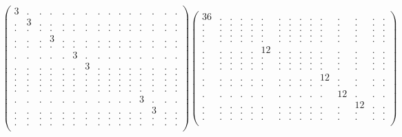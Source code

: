\documentclass[12pt,a4paper]{amsart}
\begin{document}
\begin{align*}
\left(\begin{array}{rrrrrrrrrrrrrrr}%
3&.&.&.&.&.&.&.&.&.&.&.&.&.&.\\%
.&3&.&.&.&.&.&.&.&.&.&.&.&.&.\\%
.&.&.&.&.&.&.&.&.&.&.&.&.&.&.\\%
.&.&.&3&.&.&.&.&.&.&.&.&.&.&.\\%
.&.&.&.&.&.&.&.&.&.&.&.&.&.&.\\%
.&.&.&.&.&3&.&.&.&.&.&.&.&.&.\\%
.&.&.&.&.&.&3&.&.&.&.&.&.&.&.\\%
.&.&.&.&.&.&.&.&.&.&.&.&.&.&.\\%
.&.&.&.&.&.&.&.&.&.&.&.&.&.&.\\%
.&.&.&.&.&.&.&.&.&.&.&.&.&.&.\\%
.&.&.&.&.&.&.&.&.&.&.&.&.&.&.\\%
.&.&.&.&.&.&.&.&.&.&.&3&.&.&.\\%
.&.&.&.&.&.&.&.&.&.&.&.&3&.&.\\%
.&.&.&.&.&.&.&.&.&.&.&.&.&.&.\\%
.&.&.&.&.&.&.&.&.&.&.&.&.&.&.\\%
\end{array}\right)%
\left(\begin{array}{rrrrrrrrrrrrrrr}%
36&.&.&.&.&.&.&.&.&.&.&.&.&.&.\\%
.&.&.&.&.&.&.&.&.&.&.&.&.&.&.\\%
.&.&.&.&.&.&.&.&.&.&.&.&.&.&.\\%
.&.&.&.&.&.&.&.&.&.&.&.&.&.&.\\%
.&.&.&.&.&.&.&.&.&.&.&.&.&.&.\\%
.&.&.&.&.&12&.&.&.&.&.&.&.&.&.\\%
.&.&.&.&.&.&.&.&.&.&.&.&.&.&.\\%
.&.&.&.&.&.&.&.&.&.&.&.&.&.&.\\%
.&.&.&.&.&.&.&.&.&.&.&.&.&.&.\\%
.&.&.&.&.&.&.&.&.&.&12&.&.&.&.\\%
.&.&.&.&.&.&.&.&.&.&.&.&.&.&.\\%
.&.&.&.&.&.&.&.&.&.&.&12&.&.&.\\%
.&.&.&.&.&.&.&.&.&.&.&.&12&.&.\\%
.&.&.&.&.&.&.&.&.&.&.&.&.&.&.\\%
.&.&.&.&.&.&.&.&.&.&.&.&.&.&.\\%
\end{array}\right)%
\end{align*}
\end{document}
